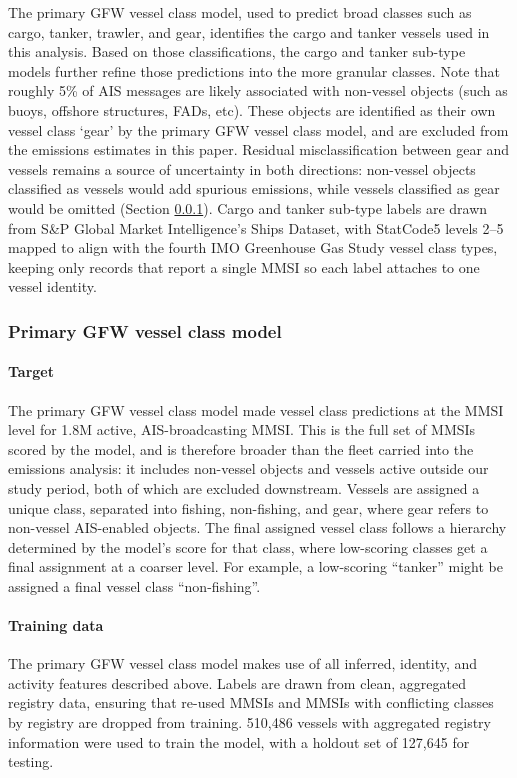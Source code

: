 \documentclass[lineno,pdflatex,sn-nature]{sn-jnl}
\begin{document}
The primary GFW vessel class model, used to predict broad classes such as cargo, tanker, trawler, and gear, identifies the cargo and tanker vessels used in this analysis. Based on those classifications, the cargo and tanker sub-type models further refine those predictions into the more granular classes. Note that roughly 5\% of AIS messages are likely associated with non-vessel objects (such as buoys, offshore structures, FADs, etc). These objects are identified as their own vessel class `gear' by the primary GFW vessel class model, and are excluded from the emissions estimates in this paper. Residual misclassification between gear and vessels remains a source of uncertainty in both directions: non-vessel objects classified as vessels would add spurious emissions, while vessels classified as gear would be omitted (Section \ref{sec:primary-vessel-class-model}). Cargo and tanker sub-type labels are drawn from S\&P Global Market Intelligence's Ships Dataset, with StatCode5 levels 2--5 mapped to align with the fourth IMO Greenhouse Gas Study vessel class types, keeping only records that report a single MMSI so each label attaches to one vessel identity.


\subsubsection{Primary GFW vessel class model}\label{sec:primary-vessel-class-model}

\paragraph{Target} 
The primary GFW vessel class model made vessel class predictions at the MMSI level for 1.8M active, AIS-broadcasting MMSI. This is the full set of MMSIs scored by the model, and is therefore broader than the fleet carried into the emissions analysis: it includes non-vessel objects and vessels active outside our study period, both of which are excluded downstream. Vessels are assigned a unique class, separated into fishing, non-fishing, and gear, where gear refers to non-vessel AIS-enabled objects.
The final assigned vessel class follows a hierarchy determined by the model’s score for that class, where low-scoring classes get a final assignment at a coarser level. For example, a low-scoring “tanker” might be assigned a final vessel class “non-fishing”.


\paragraph{Training data}
The primary GFW vessel class model makes use of all inferred, identity, and activity features described above. Labels are drawn from clean, aggregated registry data, ensuring that re-used MMSIs and MMSIs with conflicting classes by registry are dropped from training. 
510,486 vessels with aggregated registry information were used to train the model, with a holdout set of 127,645 for testing.
\end{document}
